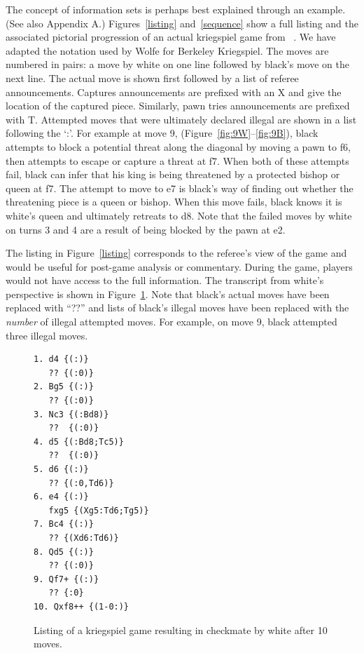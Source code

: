 \documentclass[times, 10pt,twocolumn]{article}
\begin{document}

The concept of information sets is perhaps best explained through an example.  (See also Appendix A.)
Figures~\ref{listing} and~\ref{sequence} show a full listing and the associated pictorial progression of an actual
kriegspiel game from ~\cite{li94chess}.  We have adapted the notation used by Wolfe for Berkeley Kriegspiel.  The moves
are numbered in pairs: a move by white on one line followed by black's move on the next line.  The actual move is shown
first followed by a list of referee announcements.  Captures announcements are prefixed with an X and give the location
of the captured piece.  Similarly, pawn tries announcements are prefixed with T.  Attempted moves that were ultimately
declared illegal are shown in a list following the `:'.  For example at move 9, (Figure~\ref{fig:9W}--\ref{fig:9B}),
black attempts to block a potential threat along the diagonal by moving a pawn to f6, then attempts to escape or capture
a threat at f7.  When both of these attempts fail, black can infer that his king is being threatened by a protected
bishop or queen at f7.  The attempt to move to e7 is black's way of finding out whether the threatening piece is a queen
or bishop.  When this move fails, black knows it is white's queen and ultimately retreats to d8.  Note that the failed
moves by white on turns 3 and 4 are a result of being blocked by the pawn at e2.


The listing in Figure~\ref{listing} corresponds to the referee's view of the game and would be useful for
post-game analysis or commentary.  During the game, players would not have access to the full information.  The
transcript from white's perspective is shown in Figure~\ref{filteredlisting}.  Note that black's actual moves have been
replaced with ``??'' and lists of black's illegal moves have been replaced with the {\em number} of illegal attempted
moves.  For example, on move 9, black attempted three illegal moves.
\begin{figure}
\begin{verbatim}
1. d4 {(:)}
   ?? {(:0)}
2. Bg5 {(:)}
   ?? {(:0)}
3. Nc3 {(:Bd8)}
   ??  {(:0)}
4. d5 {(:Bd8;Tc5)}
   ??  {(:0)}
5. d6 {(:)}
   ?? {(:0,Td6)}
6. e4 {(:)}
   fxg5 {(Xg5:Td6;Tg5)}
7. Bc4 {(:)}
   ?? {(Xd6:Td6)}
8. Qd5 {(:)}
   ?? {(:0)}
9. Qf7+ {(:)} 
   ?? {:0}
10. Qxf8++ {(1-0:)}
\end{verbatim}
\caption{Listing of a kriegspiel game resulting in checkmate by white after 10 moves.}
\label{filteredlisting}
\end{figure}
\end{document}

